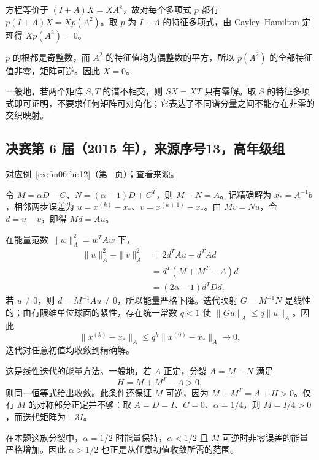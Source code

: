 \documentclass[UTF8,12pt,a4paper,fontset=fandol]{ctexart}
\begin{document}
\begin{solve}

方程等价于 $(I+A)X=XA^2$，故对每个多项式 $p$ 都有 $p(I+A)X=Xp(A^2)$。取 $p$ 为 $I+A$ 的特征多项式，由 Cayley--Hamilton 定理得 $Xp(A^2)=0$。

$p$ 的根都是奇整数，而 $A^2$ 的特征值均为偶整数的平方，所以 $p(A^2)$ 的全部特征值非零，矩阵可逆。因此 $X=0$。

\end{solve}

\begin{remark}[方法与条件]

一般地，若两个矩阵 $S,T$ 的谱不相交，则 $SX=XT$ 只有零解。取 $S$ 的特征多项式即可证明，不要求任何矩阵可对角化；它表达了不同谱分量之间不能存在非零的交织映射。

\end{remark}

\subsection{决赛第 6 届（2015 年），来源序号13，高年级组}\label{ans:fin06-hi:12}\label{pr:fin06-hi:12}

对应例~\ref{ex:fin06-hi:12}（第~\pageref{ex:fin06-hi:12} 页）；\href{https://github.com/lzxcr/cmc-mathematics/blob/64916fa1fdbc3e444a652eca204d5669058ee321/src/problems/finals/06/13.md}{查看来源}。

\begin{solve}

令 $M=\alpha D-C$、$N=(\alpha-1)D+C^T$，则 $M-N=A$。记精确解为 $x_*=A^{-1}b$，相邻两步误差为 $u=x^{(k)}-x_*$、$v=x^{(k+1)}-x_*$。由 $Mv=Nu$，令 $d=u-v$，即得 $Md=Au$。

在能量范数 $\|w\|_A^2=w^TAw$ 下，
\[
\begin{aligned}
\|u\|_A^2-\|v\|_A^2
&=2d^TAu-d^TAd\\
&=d^T(M+M^T-A)d\\
&=(2\alpha-1)d^TDd.
\end{aligned}
\]
若 $u\ne0$，则 $d=M^{-1}Au\ne0$，所以能量严格下降。迭代映射 $G=M^{-1}N$ 是线性的；由有限维单位球面的紧性，存在统一常数 $q<1$ 使 $\|Gu\|_A\le q\|u\|_A$。因此
\[
\|x^{(k)}-x_*\|_A\le q^k\|x^{(0)}-x_*\|_A\longrightarrow0,
\]
迭代对任意初值均收敛到精确解。

\end{solve}

\begin{remark}[方法与条件]

这是\hyperref[app:linear-iteration]{线性迭代的能量方法}。一般地，若 $A$ 正定，分裂 $A=M-N$ 满足
\[
H=M+M^T-A>0,
\]
则同一恒等式给出收敛。此条件还保证 $M$ 可逆，因为 $M+M^T=A+H>0$。仅有 $M$ 的对称部分正定并不够：取 $A=D=I$、$C=0$、$\alpha=1/4$，则 $M=I/4>0$，而迭代矩阵为 $-3I$。

在本题这族分裂中，$\alpha=1/2$ 时能量保持，$\alpha<1/2$ 且 $M$ 可逆时非零误差的能量严格增加。因此 $\alpha>1/2$ 也正是从任意初值收敛所需的范围。

\end{remark}
\end{document}
